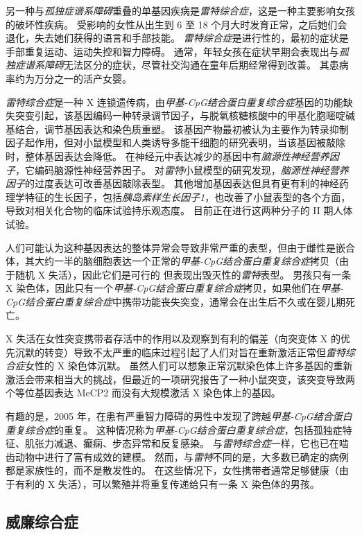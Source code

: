 另一种与\textit{孤独症谱系障碍}重叠的单基因疾病是\textit{雷特综合症}，这是一种主要影响女孩的破坏性疾病。
受影响的女性从出生到 6 至 18 个月大时发育正常，之后她们会退化，失去她们获得的语言和手部技能。
\textit{雷特综合症}是进行性的，最初的症状是手部重复运动、运动失控和智力障碍。
通常，年轻女孩在症状早期会表现出与\textit{孤独症谱系障碍}无法区分的症状，尽管社交沟通在童年后期经常得到改善。
其患病率约为万分之一的活产女婴。


\textit{雷特综合症}是一种 X 连锁遗传病，由\textit{甲基-CpG结合蛋白重复综合症}基因的功能缺失突变引起，该基因编码一种转录调节因子，与脱氧核糖核酸中的甲基化胞嘧啶碱基结合，调节基因表达和染色质重塑。
该基因产物最初被认为主要作为转录抑制因子起作用，但对小鼠模型和人类诱导多能干细胞的研究表明，当该基因被敲除时，整体基因表达会降低。
在神经元中表达减少的基因中有\textit{脑源性神经营养因子}，它编码脑源性神经营养因子。
对\textit{雷特}小鼠模型的研究发现，\textit{脑源性神经营养因子}的过度表达可改善基因敲除表型。
其他增加基因表达但具有更有利的神经药理学特征的生长因子，包括\textit{胰岛素样生长因子1}，也改善了小鼠表型的各个方面，导致对相关化合物的临床试验持乐观态度。
目前正在进行这两种分子的 II 期人体试验。


人们可能认为这种基因表达的整体异常会导致非常严重的表型，但由于雌性是嵌合体，其大约一半的脑细胞表达一个正常的\textit{甲基-CpG结合蛋白重复综合症}拷贝（由于随机 X 失活），因此它们是可行的 但表现出毁灭性的\textit{雷特}表型。
男孩只有一条 X 染色体，因此只有一个\textit{甲基-CpG结合蛋白重复综合症}拷贝，如果他们在\textit{甲基-CpG结合蛋白重复综合症}中携带功能丧失突变，通常会在出生后不久或在婴儿期死亡。


X 失活在女性突变携带者存活中的作用以及观察到有利的偏差（向突变体 X 的优先沉默的转变）导致不太严重的临床过程引起了人们对旨在重新激活正常但\textit{雷特综合症}女性的 X 染色体沉默。
虽然人们可以想象正常沉默染色体上许多基因的重新激活会带来相当大的挑战，但最近的一项研究报告了一种小鼠突变，该突变导致两个等位基因表达 MeCP2 而没有大规模激活 X 染色体上的基因。


有趣的是，2005 年，在患有严重智力障碍的男性中发现了跨越\textit{甲基-CpG结合蛋白重复综合症}的重复。
这种情况称为\textit{甲基-CpG结合蛋白重复综合症}，包括孤独症特征、肌张力减退、癫痫、步态异常和反复感染。
与\textit{雷特综合症}一样，它也已在啮齿动物中进行了富有成效的建模。
然而，与\textit{雷特}不同的是，大多数已确定的病例都是家族性的，而不是散发性的。
在这些情况下，女性携带者通常足够健康（由于有利的 X 失活），可以繁殖并将重复传递给只有一条 X 染色体的男孩。



\subsection{威廉综合症}

